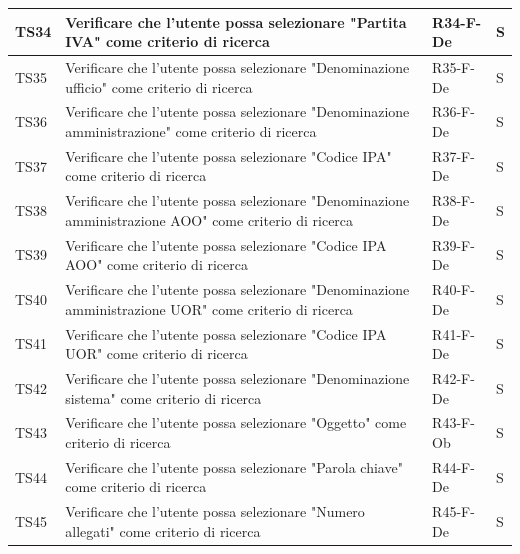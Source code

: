 \documentclass[a4paper,12pt]{article}
\begin{document}
\begin{longtable}{|M{1.2cm}|M{6.3cm}|M{2.5cm}|M{1.5cm}|}
                TS34 & Verificare che l'utente possa selezionare "Partita IVA" come criterio di ricerca & R34-F-De & S \\
                \hline

                TS35 & Verificare che l'utente possa selezionare "Denominazione ufficio" come criterio di ricerca & R35-F-De & S \\
                \hline

                TS36 & Verificare che l'utente possa selezionare "Denominazione amministrazione" come criterio di ricerca & R36-F-De & S \\
                \hline

                TS37 & Verificare che l'utente possa selezionare "Codice IPA" come criterio di ricerca & R37-F-De & S \\
                \hline

                TS38 & Verificare che l'utente possa selezionare "Denominazione amministrazione AOO" come criterio di ricerca & R38-F-De & S \\
                \hline

                TS39 & Verificare che l'utente possa selezionare "Codice IPA AOO" come criterio di ricerca & R39-F-De & S \\
                \hline

                TS40 & Verificare che l'utente possa selezionare "Denominazione amministrazione UOR" come criterio di ricerca & R40-F-De & S \\
                \hline

                TS41 & Verificare che l'utente possa selezionare "Codice IPA UOR" come criterio di ricerca & R41-F-De & S \\
                \hline

                TS42 & Verificare che l'utente possa selezionare "Denominazione sistema" come criterio di ricerca & R42-F-De & S \\
                \hline

                TS43 & Verificare che l'utente possa selezionare "Oggetto" come criterio di ricerca & R43-F-Ob & S \\
                \hline

                TS44 & Verificare che l'utente possa selezionare "Parola chiave" come criterio di ricerca & R44-F-De & S \\
                \hline

                TS45 & Verificare che l'utente possa selezionare "Numero allegati" come criterio di ricerca & R45-F-De & S \\
                \hline


\end{longtable}
\end{document}
